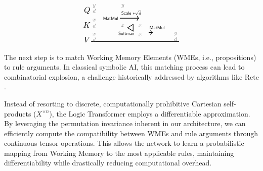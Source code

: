\documentclass[runningheads]{llncs}
\begin{document}
\begin{equation}
\begin{aligned}
{{\begin{tikzpicture}[y=1pt, x=1pt, yscale=\globalscale,xscale=\globalscale, every node/.append style={scale=\globalscale}, inner sep=0pt, outer sep=0pt]
\begin{scope}[shift={(-115.61316, 284.91126)}]
		\path[draw=black,line width=0.8pt,->] (238.40058, -201.81764) -- (306.76995, -201.81764);

		\path[draw=black,line width=0.8pt,->] (340.12491, -252.55318) -- (354.49427, -252.55318);

		\path[draw=black,line width=0.8pt] (137.32536, -284.53626) -- (447.19472, -284.53626);

		\path[draw=black,fill=white,line width=0.8pt] (285.37483, -223.58534) -- (285.37483, -247.58538) -- (265.87492, -235.58536) -- cycle;

		\node[text=black,scale=2.8] at (123.30065, -174.74652) {$Q$};
		\node[text=black,scale=2.8] at (122.17566, -225.37154) {$K$};
		\node[text=black,scale=2.8] at (123.11316, -276.93403) {$V$};

		\node[text=gray,scale=2] at (148, -158.67867) {$y$};
		\node[text=gray,scale=2] at (148, -176.05902) {$d$};
		\node[text=gray,scale=2] at (148, -208.30904) {$x$};
		\node[text=gray,scale=2] at (148, -227.99653) {$d$};
		\node[text=gray,scale=2] at (148, -257.99652) {$x$};
		\node[text=gray,scale=2] at (148, -277.49653) {$d$};

		\node[text=gray,scale=2] at (249.11315, -158.62153) {$y$};
		\node[text=gray,scale=2] at (249.11315, -228.37153) {$x$};

		\node[text=black,scale=1.6] at (206.11315, -202.30903) {\textsf{MatMul}};
		\node[text=black,scale=1.6] at (278.61316, -182.62154) {\textsf{Scale}  $* \sqrt{d}$};
		\node[text=black,scale=1.6] at (261.48817, -255.37153) {\textsf{Softmax}};

		\node[text=gray,scale=2] at (309.86317, -228.37153) {$x$};
		\node[text=gray,scale=2] at (309.86317, -260.62152) {$x$};

		\node[text=gray,scale=2] at (435, -256.87157) {$y$};
		\node[text=gray,scale=2] at (435, -274.87154) {$d$};

		\node[text=black,scale=1.6] at (369.73814, -234.74651) {\textsf{MatMul}};
	\end{scope}
\end{tikzpicture}}}
\end{aligned}
\end{equation}

The next step is to match Working Memory Elements (WMEs, i.e., propositions) to rule arguments. In classical symbolic AI, this matching process can lead to combinatorial explosion, a challenge historically addressed by algorithms like Rete \cite{Forgy1982}.

Instead of resorting to discrete, computationally prohibitive Cartesian self-products ($X^{\times n}$), the Logic Transformer employs a differentiable approximation. By leveraging the permutation invariance inherent in our architecture, we can efficiently compute the compatibility between WMEs and rule arguments through continuous tensor operations. This allows the network to learn a probabilistic mapping from Working Memory to the most applicable rules, maintaining differentiability while drastically reducing computational overhead.
\end{document}
